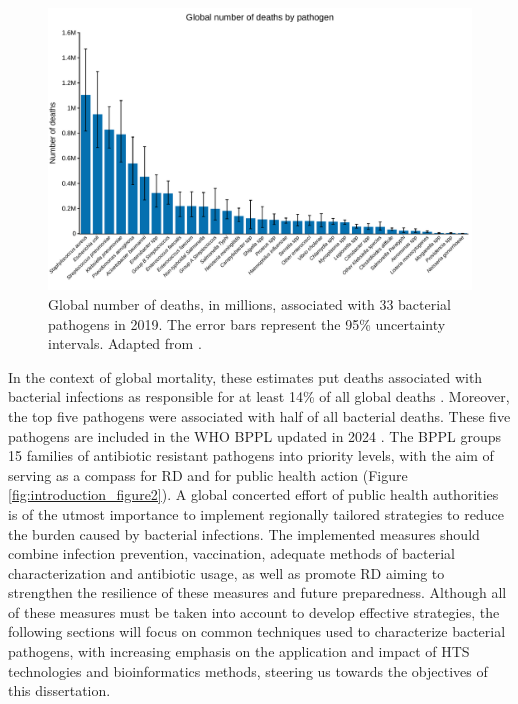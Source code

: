 \begin{figure}[!ht]
    \centering
    \includegraphics[angle=0,width=\textwidth]{figures/introduction/Figure1.pdf}
    \caption[Global number of deaths, in millions, associated with 33 bacterial pathogens in 2019]{Global number of deaths, in millions, associated with 33 bacterial pathogens in 2019. The error bars represent the 95\% uncertainty intervals. Adapted from \cite{ikuta_global_2022}.}
    \label{fig:introduction_figure1}
\end{figure}

In the context of global mortality, these estimates put deaths associated with bacterial infections as responsible for at least 14\% of all global deaths \cite{ikuta_global_2022}. Moreover, the top five pathogens were associated with half of all bacterial deaths. These five pathogens are included in the \ac{WHO} \ac{BPPL} updated in 2024 \cite{noauthor_who_2024}. The \ac{BPPL} groups 15 families of antibiotic resistant pathogens into priority levels, with the aim of serving as a compass for \ac{RD} and for public health action (Figure \ref{fig:introduction_figure2}). A global concerted effort of public health authorities is of the utmost importance to implement regionally tailored strategies to reduce the burden caused by bacterial infections. The implemented measures should combine infection prevention, vaccination, adequate methods of bacterial characterization and antibiotic usage, as well as promote \ac{RD} aiming to strengthen the resilience of these measures and future preparedness. Although all of these measures must be taken into account to develop effective strategies, the following sections will focus on common techniques used to characterize bacterial pathogens, with increasing emphasis on the application and impact of \ac{HTS} technologies and bioinformatics methods, steering us towards the objectives of this dissertation.

